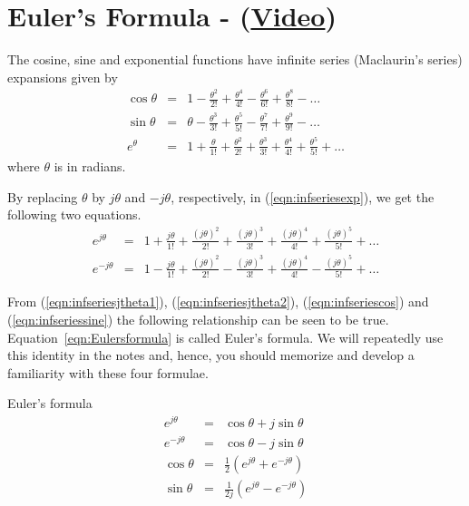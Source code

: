 \section{Euler's Formula - (\href{https://youtu.be/PE0zsikUXgg}{Video})}

The cosine, sine and exponential functions have infinite series (Maclaurin's series) expansions given by
\begin{eqnarray}
\label{eqn:infseriescos}
\cos\theta & = & 1 - \frac{\theta^2}{2!}  + \frac{\theta^4}{4!} - \frac{\theta^6}{6!} + \frac{\theta^8}{8!} - \ldots \\
\label{eqn:infseriessine}
\sin \theta & = & \theta - \frac{\theta^3}{3!}  + \frac{\theta^5}{5!} - \frac{\theta^7}{7!} + \frac{\theta^9}{9!} - \ldots \\
\label{eqn:infseriesexp}
e^\theta & = & 1 + \frac{\theta}{1!} + \frac{\theta^2}{2!}  + \frac{\theta^3}{3!} + \frac{\theta^4}{4!} + \frac{\theta^5}{5!} + \ldots
\end{eqnarray}
where $\theta$ is in radians.

By replacing $\theta$ by $j \theta$ and $-j \theta$, respectively,
in (\ref{eqn:infseriesexp}), we get the following two equations.
\begin{eqnarray}
\label{eqn:infseriesjtheta1}
e^{j \theta} & = & 1 + \frac{j \theta}{1!} + \frac{(j\theta)^2}{2!}  + \frac{(j\theta)^3}{3!} + \frac{(j\theta)^4}{4!} + \frac{(j \theta)^5}{5!} + \ldots \\
\label{eqn:infseriesjtheta2}
e^{-j \theta} & = & 1 - \frac{j \theta}{1!} + \frac{(j\theta)^2}{2!}  - \frac{(j\theta)^3}{3!} + \frac{(j\theta)^4}{4!} - \frac{(j \theta)^5}{5!} + \ldots
\end{eqnarray}

From (\ref{eqn:infseriesjtheta1}), (\ref{eqn:infseriesjtheta2}), (\ref{eqn:infseriescos}) and (\ref{eqn:infseriessine}) the following relationship can be seen to be true. Equation~\ref{eqn:Eulersformula} is called Euler's formula.
We will repeatedly use this identity in the notes and, hence, you should memorize and develop a familiarity with these four formulae.
\begin{infobox}{Euler's formula}
\begin{eqnarray}
\label{eqn:Eulersformula}
e^{j\theta} &=& \cos\theta + j\sin\theta\\
\nonumber e^{-j\theta} &=& \cos\theta - j\sin\theta \\
\nonumber \cos \theta & = & \frac{1}{2}\left( e^{j \theta} + e^{-j \theta} \right) \\
\nonumber \sin \theta & = & \frac{1}{2j}\left( e^{j \theta} - e^{-j \theta} \right)
\end{eqnarray}
\end{infobox}

